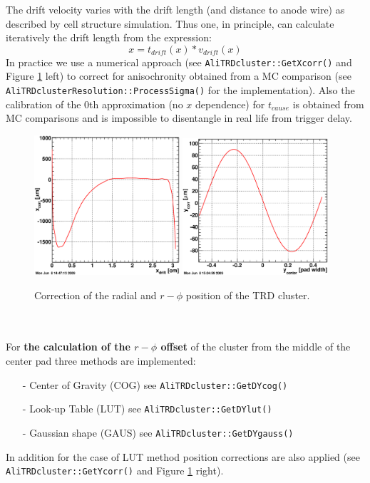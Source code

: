 \documentclass{alicetdr}
\begin{document}
The drift velocity varies with the drift length (and distance to anode wire)
as described by cell structure simulation. Thus one, in principle, can calculate
iteratively the drift length from the expression:
\begin{equation}
x = t_{drift}(x)*v_{drift}(x)
\end{equation}
In practice we use a numerical approach (see {\tt AliTRDcluster::GetXcorr()}
and Figure \ref{FIG_CLUSTER:Xcorr} left) to correct for anisochronity obtained
from a MC comparison (see {\tt AliTRDclusterResolution\-::ProcessSigma()} for
the implementation). Also the calibration of the 0th approximation (no $x$
dependence) for $t_{cause}$ is obtained from MC comparisons and is impossible
to disentangle in real life from trigger delay.
\begin{figure}[htb]
\begin{center}
\includegraphics[width=0.48\textwidth]{plots/clusterXcorr.eps}
\includegraphics[width=0.48\textwidth]{plots/clusterYcorr.eps}
\end{center}
\caption{
Correction of the radial and $r-\phi$ position of the TRD cluster.}
\label{FIG_CLUSTER:Xcorr}
\end{figure}
\\
\\
For {\bf the calculation of the $r-\phi$ offset} of the cluster from the middle
of the center pad three methods are implemented:
\begin{itemize}
  \item[-] Center of Gravity (COG) see {\tt AliTRDcluster::GetDYcog()}
  \item[-] Look-up Table (LUT) see {\tt AliTRDcluster::GetDYlut()}
  \item[-] Gaussian shape (GAUS) see {\tt AliTRDcluster::GetDYgauss()}
\end{itemize}
In addition for the case of LUT method position corrections are also applied
(see {\tt AliTRDcluster\-::GetYcorr()} and Figure \ref{FIG_CLUSTER:Xcorr} right).
\end{document}
